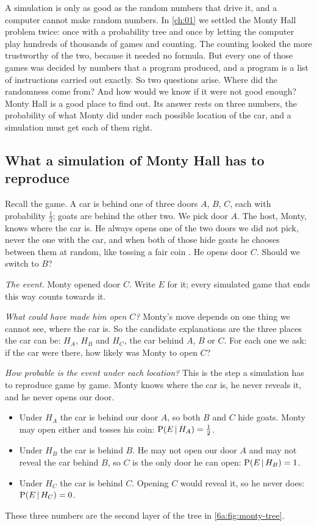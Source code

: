 A simulation is only as good as the random numbers that drive it, and a computer
cannot make random numbers. In \cref{ch:01} we settled the Monty Hall problem
twice: once with a probability tree and once by letting the computer play hundreds
of thousands of games and counting. The counting looked the more trustworthy of
the two, because it needed no formula. But every one of those games was decided by
numbers that a program produced, and a program is a list of instructions carried
out exactly. So two questions arise. Where did the randomness come from? And how
would we know if it were not good enough? Monty Hall is a good place to find out.
Its answer rests on three numbers, the probability of what Monty did under each
possible location of the car, and a simulation must get each of them right.

\subsection{What a simulation of Monty Hall has to reproduce}
\label{6a:sec:monty}

Recall the game. A car is behind one of three doors $A$, $B$, $C$, each with
probability $\tfrac13$; goats are behind the other two. We pick door $A$. The host,
Monty, knows where the car is. He always opens one of the two doors we did not
pick, never the one with the car, and when both of those hide goats he chooses
between them at random, like tossing a fair coin . He
opens door $C$. Should we switch to $B$?

\emph{The event.} Monty opened door $C$. Write $E$ for it; every simulated game
that ends this way counts towards it.

\emph{What could have made him open $C$?} Monty's move depends on one thing we
cannot see, where the car is. So the candidate explanations are the three
places the car can be: $H_A$, $H_B$ and $H_C$, the car behind $A$, $B$ or $C$.
For each one we ask: if the car were there, how likely was Monty to open $C$?

\emph{How probable is the event under each location?} This is the step a
simulation has to reproduce game by game. Monty knows where the car is, he
never reveals it, and he never opens our door.
\begin{itemize}[leftmargin=1.5em,itemsep=1pt]
  \item Under $H_A$ the car is behind our door $A$, so both $B$ and $C$ hide
        goats. Monty may open either and tosses his coin:
        $\operatorname{P}(E\,\vert\, H_A)=\tfrac12$.
  \item Under $H_B$ the car is behind $B$. He may not open our door $A$ and may
        not reveal the car behind $B$, so $C$ is the only door he can open:
        $\operatorname{P}(E\,\vert\, H_B)=1$.
  \item Under $H_C$ the car is behind $C$. Opening $C$ would reveal it, so he
        never does: $\operatorname{P}(E\,\vert\, H_C)=0$.
\end{itemize}
These three numbers are the second layer of the tree in
\cref{6a:fig:monty-tree}.

